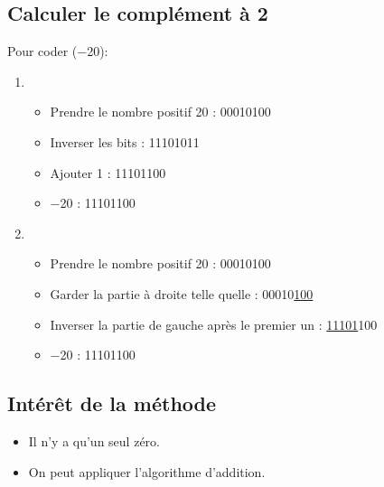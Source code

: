 \documentclass[a4paper,11pt]{article}
\begin{document}
\subsection{Calculer le complément à 2}
Pour coder (−20):
\begin{enumerate}
    \item \begin{itemize}
        \item Prendre le nombre positif 20 : 00010100
        \item Inverser les bits : 11101011
        \item Ajouter 1 : 11101100
        \item −20 : 11101100
    \end{itemize}
    \item \begin{itemize}
        \item Prendre le nombre positif 20 : 00010100
        \item Garder la partie à droite telle quelle : 00010\underline{100}
        \item Inverser la partie de gauche après le premier un : \underline{11101}100
        \item −20 : 11101100
    \end{itemize}
\end{enumerate}
\subsection{Intérêt de la méthode}
\begin{itemize}
    \item Il n'y a qu'un seul zéro.
    \item On peut appliquer l'algorithme d'addition.
\end{itemize}
    
\end{document}
